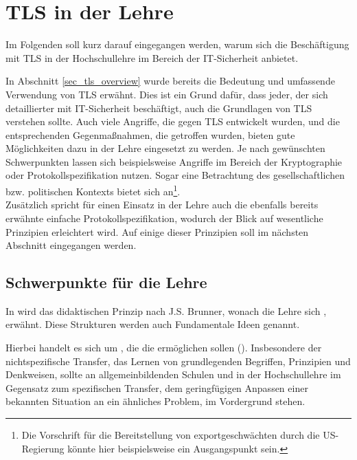 \chapter{TLS in der Lehre}
\label{cha_tls_teaching}

Im Folgenden soll kurz darauf eingegangen werden, warum sich die Beschäftigung mit TLS in der Hochschullehre im Bereich der IT-Sicherheit anbietet. %

In Abschnitt \ref{sec_tls_overview} wurde bereits die Bedeutung und umfassende Verwendung von TLS erwähnt. Dies ist ein Grund dafür, dass jeder, der sich detaillierter mit IT-Sicherheit beschäftigt, auch die Grundlagen von TLS verstehen sollte. Auch viele Angriffe, die gegen TLS entwickelt wurden, und die entsprechenden Gegenmaßnahmen, die getroffen wurden, bieten gute Möglichkeiten dazu in der Lehre eingesetzt zu werden. Je nach gewünschten Schwerpunkten lassen sich beispielsweise Angriffe im Bereich der Kryptographie oder Protokollspezifikation nutzen. Sogar eine Betrachtung des gesellschaftlichen bzw. politischen Kontexts bietet sich an\footnote{Die Vorschrift für die Bereitstellung von exportgeschwächten \ciphersuites{} durch die US-Regierung könnte hier beispielsweise ein Ausgangspunkt sein.}.\\
Zusätzlich spricht für einen Einsatz in der Lehre auch die ebenfalls bereits erwähnte einfache Protokollspezifikation, wodurch der Blick auf wesentliche Prinzipien erleichtert wird. Auf einige dieser Prinzipien soll im nächsten Abschnitt eingegangen werden.

\section{Schwerpunkte für die Lehre}

In \cite{schubert11} wird das didaktischen Prinzip nach J.S. Brunner, wonach die Lehre sich , erwähnt. Diese Strukturen werden auch Fundamentale Ideen genannt.

Hierbei handelt es sich um , die die  ermöglichen sollen (\cite{schubert11}). Insbesondere der nichtspezifische Transfer, das Lernen von grundlegenden Begriffen, Prinzipien und Denkweisen, sollte an allgemeinbildenden Schulen und in der Hochschullehre im Gegensatz zum spezifischen Transfer, dem geringfügigen Anpassen einer bekannten Situation an ein ähnliches Problem, im Vordergrund stehen.

